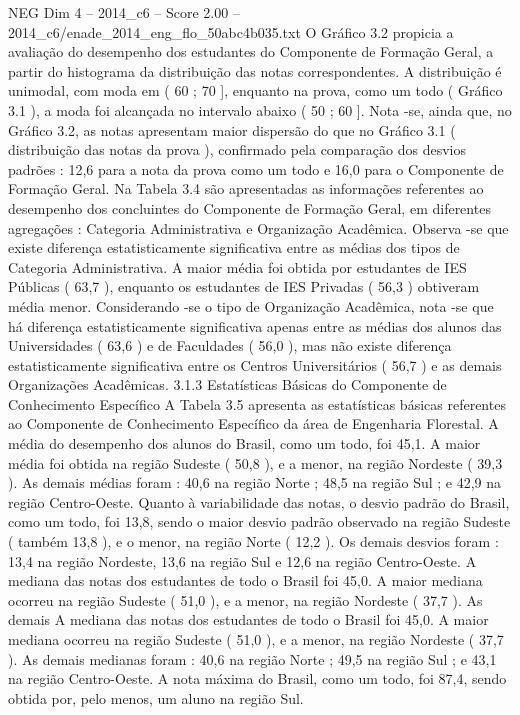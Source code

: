 \begin{textsample}{NEG Dim 4 – 2014\_c6 – Score 2.00 – 2014\_c6/enade\_2014\_eng\_flo\_50abc4b035.txt}
O Gráfico 3.2 propicia a avaliação do desempenho dos estudantes do Componente de Formação Geral, a partir do histograma da distribuição das notas correspondentes.
A distribuição é unimodal, com moda em ( 60 ; 70 ], enquanto na prova, como um todo ( Gráfico 3.1 ), a moda foi alcançada no intervalo abaixo ( 50 ; 60 ].
Nota -se, ainda que, no Gráfico 3.2, as notas apresentam maior dispersão do que no Gráfico 3.1 ( distribuição das notas da prova ), confirmado pela comparação dos desvios padrões : 12,6 para a nota da prova como um todo e 16,0 para o Componente de Formação Geral.
Na Tabela 3.4 são apresentadas as informações referentes ao desempenho dos concluintes do Componente de Formação Geral, em diferentes agregações : Categoria Administrativa e Organização Acadêmica.
Observa -se que existe diferença estatisticamente significativa entre as médias dos tipos de Categoria Administrativa.
A maior média foi obtida por estudantes de IES Públicas ( 63,7 ), enquanto os estudantes de IES Privadas ( 56,3 ) obtiveram média menor.
Considerando -se o tipo de Organização Acadêmica, nota -se que há diferença estatisticamente significativa apenas entre as médias dos alunos das Universidades ( 63,6 ) e de Faculdades ( 56,0 ), mas não existe diferença estatisticamente significativa entre os Centros Universitários ( 56,7 ) e as demais Organizações Acadêmicas. 3.1.3 Estatísticas Básicas do Componente de Conhecimento Específico A Tabela 3.5 apresenta as estatísticas básicas referentes ao Componente de Conhecimento Específico da área de Engenharia Florestal.
A média do desempenho dos alunos do Brasil, como um todo, foi 45,1.
A maior média foi obtida na região Sudeste ( 50,8 ), e a menor, na região Nordeste ( 39,3 ).
As demais médias foram : 40,6 na região Norte ; 48,5 na região Sul ; e 42,9 na região Centro-Oeste.
Quanto à variabilidade das notas, o desvio padrão do Brasil, como um todo, foi 13,8, sendo o maior desvio padrão observado na região Sudeste ( também 13,8 ), e o menor, na região Norte ( 12,2 ).
Os demais desvios foram : 13,4 na região Nordeste, 13,6 na região Sul e 12,6 na região Centro-Oeste.
A mediana das notas dos estudantes de todo o Brasil foi 45,0.
A maior mediana ocorreu na região Sudeste ( 51,0 ), e a menor, na região Nordeste ( 37,7 ).
As demais A mediana das notas dos estudantes de todo o Brasil foi 45,0.
A maior mediana ocorreu na região Sudeste ( 51,0 ), e a menor, na região Nordeste ( 37,7 ).
As demais medianas foram : 40,6 na região Norte ; 49,5 na região Sul ; e 43,1 na região Centro-Oeste.
A nota máxima do Brasil, como um todo, foi 87,4, sendo obtida por, pelo menos, um aluno na região Sul.

\end{textsample}

